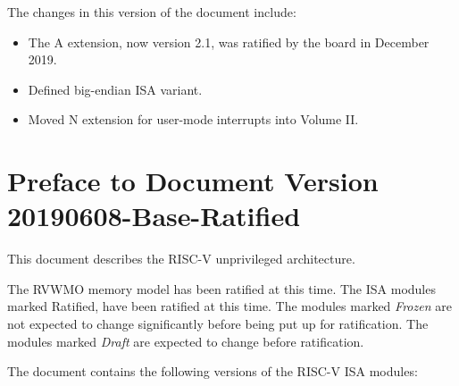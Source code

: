 The changes in this version of the document include:
\vspace{-0.2in}
\begin{itemize}
\parskip 0pt
\itemsep 1pt
\item The A extension, now version 2.1, was ratified by the board in
  December 2019.
\item Defined big-endian ISA variant.
\item Moved N extension for user-mode interrupts into Volume II.
\end{itemize}

\section*{Preface to Document Version 20190608-Base-Ratified}

This document describes the RISC-V unprivileged architecture.  

The RVWMO memory model has been ratified at this time.  The ISA
modules marked Ratified, have been ratified at this time.  The modules
marked {\em Frozen} are not expected to change significantly before
being put up for ratification.  The modules marked {\em Draft} are
expected to change before ratification.

The document contains the following versions of the RISC-V ISA
modules:

